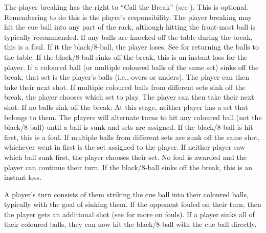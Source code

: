  \CueBallPlacement%
 The player breaking has the right to “Call the Break” (see ). This is optional. Remembering to do this is the player's responsibility.%
The player breaking may hit the cue ball into any part of the rack, although hitting the front-most ball is typically recommended.%
 {}%
 \CueBallRailOffBreak%
 \CueBallSinkOffBreak%
 If any balls are knocked off the table during the break, this is a foul. If it the black/8-ball, the player loses. See  for returning the balls to the table.%
 If the black/8-ball sinks off the break, this is an instant loss for the player.%
 If a coloured ball (or multiple coloured balls of the same set) sinks off the break, that set is the player's balls (i.e., overs or unders). The player can then take their next shot.%
 If multiple coloured balls from different sets sink off the break, the player chooses which set to play. The player can then take their next shot.%
If no balls sink off the break:%
\subruleitem At this stage, neither player has a set that belongs to them. The players will alternate turns to hit any coloured ball (not the black/8-ball) until a ball is sunk and sets are assigned.%
\subruleitem If the black/8-ball is hit first, this is a foul.%
\subruleitem If multiple balls from different sets are sunk off the same shot, whichever went in first is the set assigned to the player. If neither player saw which ball sunk first, the player chooses their set. No foul is awarded and the player can continue their turn.%
 If the black/8-ball sinks off the break, this is an instant loss.%


 A player's turn consists of them striking the cue ball into their coloured balls, typically with the goal of sinking them.%
 \FootOnGround%
 If the opponent fouled on their turn, then the player gets an additional shot (see  for more on fouls).%
 If a player sinks all of their coloured balls, they can now hit the black/8-ball with the cue ball directly.%
 {}%


